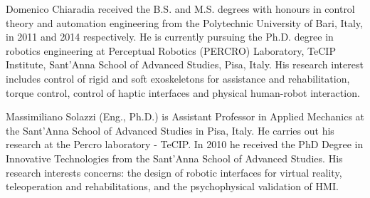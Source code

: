 % 
\begin{IEEEbiography}{Domenico Chiaradia}
received the B.S. and M.S. degrees with honours in control theory and automation engineering from the Polytechnic University of Bari, Italy, in 2011 and 2014 respectively.  He is currently pursuing the Ph.D. degree in robotics engineering at Perceptual Robotics (PERCRO) Laboratory, TeCIP Institute, Sant'Anna School of Advanced Studies, Pisa, Italy.
His research interest includes control of rigid and soft exoskeletons for assistance and rehabilitation, torque control, control of haptic interfaces and physical human-robot interaction.
%
\end{IEEEbiography}

\begin{IEEEbiography}{Massimiliano Solazzi} (Eng., Ph.D.) is Assistant Professor in Applied Mechanics at the Sant'Anna School of Advanced Studies in Pisa, Italy. He carries out his research at the Percro laboratory - TeCIP.  In 2010 he received the PhD Degree in Innovative Technologies from the Sant'Anna School of Advanced Studies. 
His research interests concerns: the design of robotic interfaces for virtual reality, teleoperation and rehabilitations, and the psychophysical validation of HMI.
\end{IEEEbiography}


